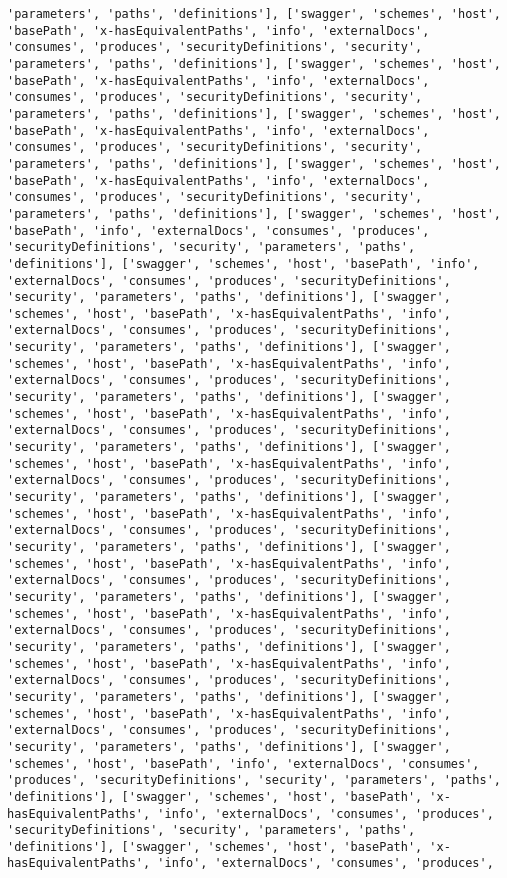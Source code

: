 \documentclass[11pt]{article}
\begin{document}
\begin{Verbatim}[commandchars=\\\{\}]
'parameters', 'paths', 'definitions'], ['swagger', 'schemes', 'host', 'basePath', 'x-hasEquivalentPaths', 'info', 'externalDocs', 'consumes', 'produces', 'securityDefinitions', 'security', 'parameters', 'paths', 'definitions'], ['swagger', 'schemes', 'host', 'basePath', 'x-hasEquivalentPaths', 'info', 'externalDocs', 'consumes', 'produces', 'securityDefinitions', 'security', 'parameters', 'paths', 'definitions'], ['swagger', 'schemes', 'host', 'basePath', 'x-hasEquivalentPaths', 'info', 'externalDocs', 'consumes', 'produces', 'securityDefinitions', 'security', 'parameters', 'paths', 'definitions'], ['swagger', 'schemes', 'host', 'basePath', 'x-hasEquivalentPaths', 'info', 'externalDocs', 'consumes', 'produces', 'securityDefinitions', 'security', 'parameters', 'paths', 'definitions'], ['swagger', 'schemes', 'host', 'basePath', 'info', 'externalDocs', 'consumes', 'produces', 'securityDefinitions', 'security', 'parameters', 'paths', 'definitions'], ['swagger', 'schemes', 'host', 'basePath', 'info', 'externalDocs', 'consumes', 'produces', 'securityDefinitions', 'security', 'parameters', 'paths', 'definitions'], ['swagger', 'schemes', 'host', 'basePath', 'x-hasEquivalentPaths', 'info', 'externalDocs', 'consumes', 'produces', 'securityDefinitions', 'security', 'parameters', 'paths', 'definitions'], ['swagger', 'schemes', 'host', 'basePath', 'x-hasEquivalentPaths', 'info', 'externalDocs', 'consumes', 'produces', 'securityDefinitions', 'security', 'parameters', 'paths', 'definitions'], ['swagger', 'schemes', 'host', 'basePath', 'x-hasEquivalentPaths', 'info', 'externalDocs', 'consumes', 'produces', 'securityDefinitions', 'security', 'parameters', 'paths', 'definitions'], ['swagger', 'schemes', 'host', 'basePath', 'x-hasEquivalentPaths', 'info', 'externalDocs', 'consumes', 'produces', 'securityDefinitions', 'security', 'parameters', 'paths', 'definitions'], ['swagger', 'schemes', 'host', 'basePath', 'x-hasEquivalentPaths', 'info', 'externalDocs', 'consumes', 'produces', 'securityDefinitions', 'security', 'parameters', 'paths', 'definitions'], ['swagger', 'schemes', 'host', 'basePath', 'x-hasEquivalentPaths', 'info', 'externalDocs', 'consumes', 'produces', 'securityDefinitions', 'security', 'parameters', 'paths', 'definitions'], ['swagger', 'schemes', 'host', 'basePath', 'x-hasEquivalentPaths', 'info', 'externalDocs', 'consumes', 'produces', 'securityDefinitions', 'security', 'parameters', 'paths', 'definitions'], ['swagger', 'schemes', 'host', 'basePath', 'x-hasEquivalentPaths', 'info', 'externalDocs', 'consumes', 'produces', 'securityDefinitions', 'security', 'parameters', 'paths', 'definitions'], ['swagger', 'schemes', 'host', 'basePath', 'x-hasEquivalentPaths', 'info', 'externalDocs', 'consumes', 'produces', 'securityDefinitions', 'security', 'parameters', 'paths', 'definitions'], ['swagger', 'schemes', 'host', 'basePath', 'info', 'externalDocs', 'consumes', 'produces', 'securityDefinitions', 'security', 'parameters', 'paths', 'definitions'], ['swagger', 'schemes', 'host', 'basePath', 'x-hasEquivalentPaths', 'info', 'externalDocs', 'consumes', 'produces', 'securityDefinitions', 'security', 'parameters', 'paths', 'definitions'], ['swagger', 'schemes', 'host', 'basePath', 'x-hasEquivalentPaths', 'info', 'externalDocs', 'consumes', 'produces', 
\end{Verbatim}
\end{document}
